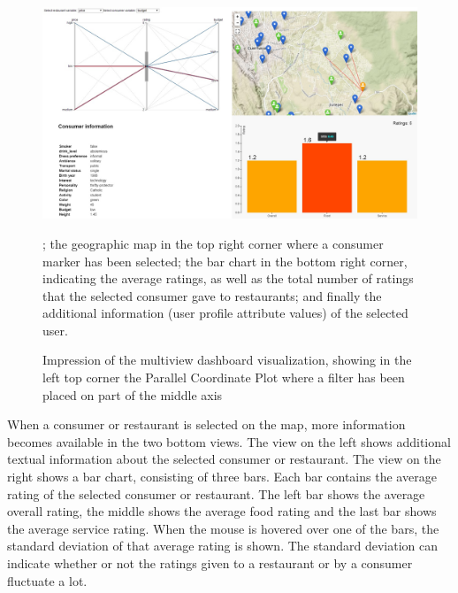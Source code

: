 \begin{figure}[h!]
 \centering
 \includegraphics[width=1\textwidth]{img/dashboard-final.jpg}
 \caption{Impression of the multiview dashboard visualization, showing in the left top corner the Parallel Coordinate Plot where a filter has been placed on part of the middle axis}; the geographic map in the top right corner where a consumer marker has been selected; the bar chart in the bottom right corner, indicating the average ratings, as well as the total number of ratings that the selected consumer gave to restaurants; and finally the additional information (user profile attribute values) of the selected user.
 \label{dashboard-view}
\end{figure}

When a consumer or restaurant is selected on the map, more information becomes available in the two bottom views. The view on the left shows additional textual information about the selected consumer or restaurant. The view on the right shows a bar chart, consisting of three bars. Each bar contains the average rating of the selected consumer or restaurant. The left bar shows the average overall rating, the middle shows the average food rating and the last bar shows the average service rating. When the mouse is hovered over one of the bars, the standard deviation of that average rating is shown. The standard deviation can indicate whether or not the ratings given to a restaurant or by a consumer fluctuate a lot.





